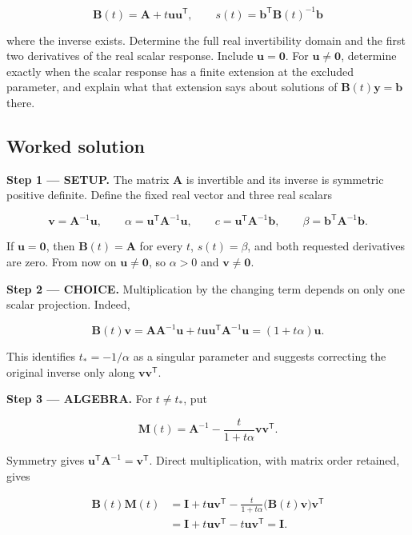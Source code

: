 \documentclass[11pt,oneside,openany]{book}
\begin{document}
\[
\mathbf B(t)=\mathbf A+t\mathbf u\mathbf u^{\mathsf T},\qquad
s(t)=\mathbf b^{\mathsf T}\mathbf B(t)^{-1}\mathbf b
\]

where the inverse exists. Determine the full real invertibility domain and the first two derivatives of the real scalar response. Include \(\mathbf u=\mathbf0\). For \(\mathbf u\ne\mathbf0\), determine exactly when the scalar response has a finite extension at the excluded parameter, and explain what that extension says about solutions of \(\mathbf B(t)\mathbf y=\mathbf b\) there.
\subsection*{Worked solution}

\textbf{Step 1 --- SETUP.} The matrix \(\mathbf A\) is invertible and its inverse is symmetric positive definite. Define the fixed real vector and three real scalars

\[
\mathbf v=\mathbf A^{-1}\mathbf u,\qquad
\alpha=\mathbf u^{\mathsf T}\mathbf A^{-1}\mathbf u,\qquad
c=\mathbf u^{\mathsf T}\mathbf A^{-1}\mathbf b,\qquad
\beta=\mathbf b^{\mathsf T}\mathbf A^{-1}\mathbf b.
\]

If \(\mathbf u=\mathbf0\), then \(\mathbf B(t)=\mathbf A\) for every \(t\), \(s(t)=\beta\), and both requested derivatives are zero. From now on \(\mathbf u\ne\mathbf0\), so \(\alpha>0\) and \(\mathbf v\ne\mathbf0\).

\begin{ChoiceStep}
\textbf{Step 2 --- CHOICE.} Multiplication by the changing term depends on only one scalar projection. Indeed,

\[
\mathbf B(t)\mathbf v
=\mathbf A\mathbf A^{-1}\mathbf u+t\mathbf u\mathbf u^{\mathsf T}\mathbf A^{-1}\mathbf u
=(1+t\alpha)\mathbf u.
\]

This identifies \(t_*=-1/\alpha\) as a singular parameter and suggests correcting the original inverse only along \(\mathbf v\mathbf v^{\mathsf T}\).

\end{ChoiceStep}
\begingroup\color{AlgebraBlue}
\textbf{Step 3 --- ALGEBRA.} For \(t\ne t_*\), put

\[
\mathbf M(t)=\mathbf A^{-1}-\frac{t}{1+t\alpha}\mathbf v\mathbf v^{\mathsf T}.
\]

Symmetry gives \(\mathbf u^{\mathsf T}\mathbf A^{-1}=\mathbf v^{\mathsf T}\). Direct multiplication, with matrix order retained, gives

\[
\begin{aligned}
\mathbf B(t)\mathbf M(t)
&=\mathbf I+t\mathbf u\mathbf v^{\mathsf T}
-\frac{t}{1+t\alpha}\bigl(\mathbf B(t)\mathbf v\bigr)\mathbf v^{\mathsf T}\\
&=\mathbf I+t\mathbf u\mathbf v^{\mathsf T}-t\mathbf u\mathbf v^{\mathsf T}
=\mathbf I.
\end{aligned}
\]
\end{document}
